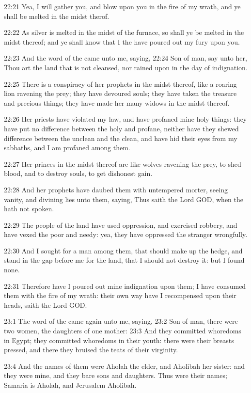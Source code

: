 22:21 Yea, I will gather you, and blow upon you in the fire of my
wrath, and ye shall be melted in the midst therof.

22:22 As silver is melted in the midst of the furnace, so shall ye be
melted in the midst thereof; and ye shall know that I the \LORD have
poured out my fury upon you.

22:23 And the word of the \LORD came unto me, saying, 22:24 Son of man,
say unto her, Thou art the land that is not cleansed, nor rained upon
in the day of indignation.

22:25 There is a conspiracy of her prophets in the midst thereof, like
a roaring lion ravening the prey; they have devoured souls; they have
taken the treasure and precious things; they have made her many widows
in the midst thereof.

22:26 Her priests have violated my law, and have profaned mine holy
things: they have put no difference between the holy and profane,
neither have they shewed difference between the unclean and the clean,
and have hid their eyes from my sabbaths, and I am profaned among
them.

22:27 Her princes in the midst thereof are like wolves ravening the
prey, to shed blood, and to destroy souls, to get dishonest gain.

22:28 And her prophets have daubed them with untempered morter, seeing
vanity, and divining lies unto them, saying, Thus saith the Lord GOD,
when the \LORD hath not spoken.

22:29 The people of the land have used oppression, and exercised
robbery, and have vexed the poor and needy: yea, they have oppressed
the stranger wrongfully.

22:30 And I sought for a man among them, that should make up the
hedge, and stand in the gap before me for the land, that I should not
destroy it: but I found none.

22:31 Therefore have I poured out mine indignation upon them; I have
consumed them with the fire of my wrath: their own way have I
recompensed upon their heads, saith the Lord GOD.

23:1 The word of the \LORD came again unto me, saying, 23:2 Son of man,
there were two women, the daughters of one mother: 23:3 And they
committed whoredoms in Egypt; they committed whoredoms in their youth:
there were their breasts pressed, and there they bruised the teats of
their virginity.

23:4 And the names of them were Aholah the elder, and Aholibah her
sister: and they were mine, and they bare sons and daughters. Thus
were their names; Samaria is Aholah, and Jerusalem Aholibah.

